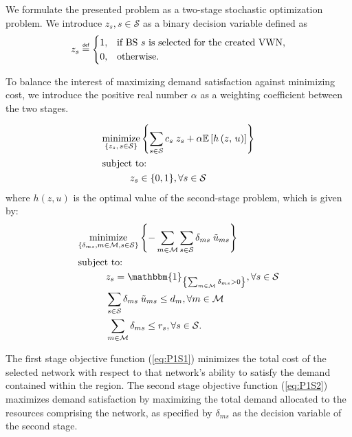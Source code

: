\documentclass[12pt,dvips]{report}
\newcommand\myeq{\mathrel{\overset{\makebox[0pt]{\mbox{\normalfont\tiny\sffamily def}}}{=}}}
\begin{document}
We formulate the presented problem as a two-stage stochastic optimization problem.  We introduce $z_s, s \in \mathcal{S}$ as a binary decision variable defined as
\[ z_s \myeq
	\begin{cases}
		1,& \text{if BS $s$ is selected for the created VWN,}\\
		0,& \text{otherwise.}
	\end{cases}
\]

To balance the interest of maximizing demand satisfaction against minimizing cost, we introduce the positive real number $\alpha$ as a weighting coefficient between the two stages.

\vspace{3mm}
\begin{tcolorbox}[title = Problem 1 (Two-Stage Stochastic Optimization Problem)]
\begin{align}
& \underset{\left\{z_s,\, s \in \mathcal{S}\right\}}{\text{minimize}} \left\{ \sum_{s \in \mathcal{S}} c_s \; z_s + \alpha \mathbb{E}\left[ h\left( z,\, u \right) \right] \right\} \label{eq:P1S1}\\
& \text{subject to:}  \nonumber \\
& \hspace{0.4in} z_s \in \{0, 1\}, \forall s \in \mathcal{S} \label{eq:P1S1C1}
\end{align}
where $h(z, u)$ is the optimal value of the second-stage problem, which is given by:
\begin{align}
& \underset{\left\{\substack{\delta_{ms}, m \in \mathcal{M}, s \in \mathcal{S}}\right\}}{\mathrm{minimize}} \left\{ - \sum_{m \in \mathcal{M}} \sum_{s \in \mathcal{S}} \delta_{ms} \; \tilde{u}_{ms} \right\} \label{eq:P1S2}\\
& \text{subject to:}  \nonumber \\
& \hspace{0.4in} z_s = \mathbbm{1}_{\left\{\sum_{m \in \mathcal{M}} \delta_{ms} > 0\right\}}, \forall s \in \mathcal{S} \label{eq:P1S2C1}\\
& \hspace{0.4in} \sum_{s \in \mathcal{S}} \delta_{ms} \; \tilde{u}_{ms} \leq d_m, \forall m \in \mathcal{M} \label{eq:P1S2C2}\\
& \hspace{0.4in} \sum_{m \in \mathcal{M}} \delta_{ms} \leq r_s, \forall s \in \mathcal{S}. \label{eq:P1S2C3}
\end{align}
\end{tcolorbox}

The first stage objective function (\ref{eq:P1S1}) minimizes the total cost of the selected network with respect to that network's ability to satisfy the demand contained within the region.  The second stage objective function (\ref{eq:P1S2}) maximizes demand satisfaction by maximizing the total demand allocated to the resources comprising the network, as specified by $\delta_{ms}$ as the decision variable of the second stage.
\end{document}
